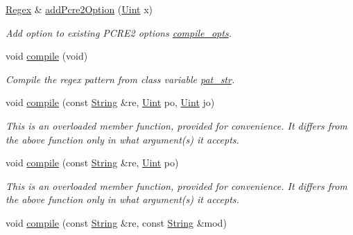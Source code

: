 \begin{DoxyCompactItemize}
\hyperlink{classjpcre2_1_1Regex}{Regex} \& \hyperlink{classjpcre2_1_1Regex_a2c7dcf12f26b2b046e147b013c8b5087_a2c7dcf12f26b2b046e147b013c8b5087}{add\+Pcre2\+Option} (\hyperlink{namespacejpcre2_a078242d38221a13fb3543b9edd78c099}{Uint} x)
\begin{DoxyCompactList}\small\item\em Add option to existing P\+C\+R\+E2 options \hyperlink{classjpcre2_1_1Regex_a5954131e9085de63229ed5c11417df69}{compile\+\_\+opts}. \end{DoxyCompactList}\item 
void \hyperlink{classjpcre2_1_1Regex_aad1d5ef1e87f762f68a587eec4022e69_aad1d5ef1e87f762f68a587eec4022e69}{compile} (void)
\begin{DoxyCompactList}\small\item\em Compile the regex pattern from class variable \hyperlink{classjpcre2_1_1Regex_a0bceb85b6dbba355b56b5cc312214435}{pat\+\_\+str}. \end{DoxyCompactList}\item 
void \hyperlink{classjpcre2_1_1Regex_a4640915bc907aa3b80da543f1eb7e74f_a4640915bc907aa3b80da543f1eb7e74f}{compile} (const \hyperlink{namespacejpcre2_a91f03070152fb228bc116c5a737f1d16}{String} \&re, \hyperlink{namespacejpcre2_a078242d38221a13fb3543b9edd78c099}{Uint} po, \hyperlink{namespacejpcre2_a078242d38221a13fb3543b9edd78c099}{Uint} jo)
\begin{DoxyCompactList}\small\item\em This is an overloaded member function, provided for convenience. It differs from the above function only in what argument(s) it accepts. \end{DoxyCompactList}\item 
void \hyperlink{classjpcre2_1_1Regex_a01394dcb222c4d442cabbffb4bcf570a_a01394dcb222c4d442cabbffb4bcf570a}{compile} (const \hyperlink{namespacejpcre2_a91f03070152fb228bc116c5a737f1d16}{String} \&re, \hyperlink{namespacejpcre2_a078242d38221a13fb3543b9edd78c099}{Uint} po)
\begin{DoxyCompactList}\small\item\em This is an overloaded member function, provided for convenience. It differs from the above function only in what argument(s) it accepts. \end{DoxyCompactList}\item 
void \hyperlink{classjpcre2_1_1Regex_acd49e856009160c622e90b81b6557d8d_acd49e856009160c622e90b81b6557d8d}{compile} (const \hyperlink{namespacejpcre2_a91f03070152fb228bc116c5a737f1d16}{String} \&re, const \hyperlink{namespacejpcre2_a91f03070152fb228bc116c5a737f1d16}{String} \&mod)

\end{DoxyCompactItemize}
